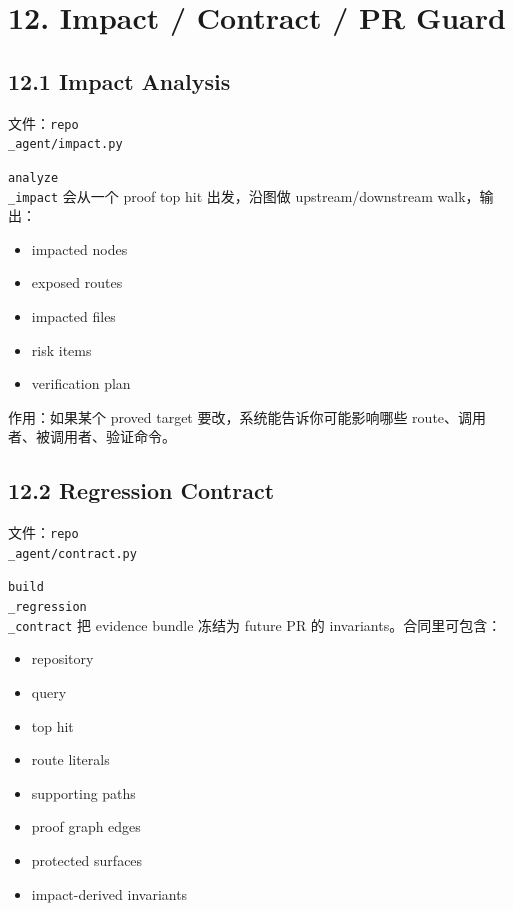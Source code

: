 \documentclass[UTF8,12pt,openany]{ctexbook}
\begin{document}
\section{12. Impact / Contract / PR Guard}

\subsection{12.1 Impact Analysis}

文件：\texttt{repo\\_agent/impact.py}\par

\texttt{analyze\\_impact} 会从一个 proof top hit 出发，沿图做 upstream/downstream walk，输出：\par

\begin{itemize}
\item impacted nodes
\item exposed routes
\item impacted files
\item risk items
\item verification plan
\end{itemize}

作用：如果某个 proved target 要改，系统能告诉你可能影响哪些 route、调用者、被调用者、验证命令。\par

\subsection{12.2 Regression Contract}

文件：\texttt{repo\\_agent/contract.py}\par

\texttt{build\\_regression\\_contract} 把 evidence bundle 冻结为 future PR 的 invariants。合同里可包含：\par

\begin{itemize}
\item repository
\item query
\item top hit
\item route literals
\item supporting paths
\item proof graph edges
\item protected surfaces
\item impact-derived invariants
\end{itemize}
\end{document}
